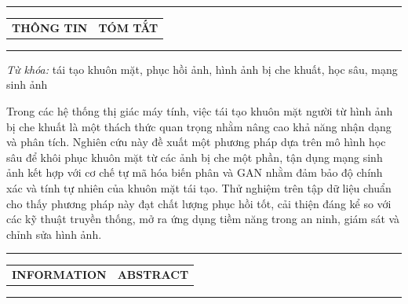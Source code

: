 \documentclass[12pt,a4paper]{article}
\title{\vspace{-2em}
	\textbf{\MakeUppercase{\parbox{\linewidth}{\centering
				TÁI TẠO KHUÔN MẶT NGƯỜI TỪ HÌNH ẢNH BỊ CHE KHUẤT BẰNG PHƯƠNG PHÁP MÔ HÌNH HỌC SÂU}}}}
\author{
	Phạm Phước Minh Hiếu*, Cao Sỹ Siêu\\
	\small Trường Đại học Quản lý và Công nghệ Thành Phố Hồ Chí Minh\\
	\small \textit{*Tác giả liên hệ: hieu.2201700085@st.umt.edu.vn}
}
\date{}
\begin{document}
	
	\maketitle
	
	\vspace{-0.8em}
	\noindent\rule{\textwidth}{0.6pt}
	
	\vspace{0.3em}
	
\noindent
\begin{tabularx}{\textwidth}{X X}
	\centering\textbf{\MakeUppercase{THÔNG TIN}} & \centering\textbf{\MakeUppercase{TÓM TẮT}} \tabularnewline
\end{tabularx}

\vspace{0.3em}
\noindent\rule{\textwidth}{0.6pt}

\noindent
\begin{minipage}[t]{0.48\textwidth}
	\textit{Từ khóa:} tái tạo khuôn mặt, phục hồi ảnh, hình ảnh bị che khuất, học sâu, mạng sinh ảnh
\end{minipage}
\hfill
\begin{minipage}[t]{0.48\textwidth}
	Trong các hệ thống thị giác máy tính, việc tái tạo khuôn mặt người từ hình ảnh bị che khuất là một thách thức quan trọng nhằm nâng cao khả năng nhận dạng và phân tích. Nghiên cứu này đề xuất một phương pháp dựa trên mô hình học sâu để khôi phục khuôn mặt từ các ảnh bị che một phần, tận dụng mạng sinh ảnh kết hợp với cơ chế tự mã hóa biến phân và GAN nhằm đảm bảo độ chính xác và tính tự nhiên của khuôn mặt tái tạo. Thử nghiệm trên tập dữ liệu chuẩn cho thấy phương pháp này đạt chất lượng phục hồi tốt, cải thiện đáng kể so với các kỹ thuật truyền thống, mở ra ứng dụng tiềm năng trong an ninh, giám sát và chỉnh sửa hình ảnh.
\end{minipage}

\vspace{0.5em}
\noindent\rule{\textwidth}{0.6pt}

\begin{tabularx}{\textwidth}{X X}
	\centering\textbf{\MakeUppercase{INFORMATION}} & \centering\textbf{\MakeUppercase{ABSTRACT}} \tabularnewline
\end{tabularx}

\vspace{0.3em}
\noindent\rule{\textwidth}{0.6pt}
\end{document}
